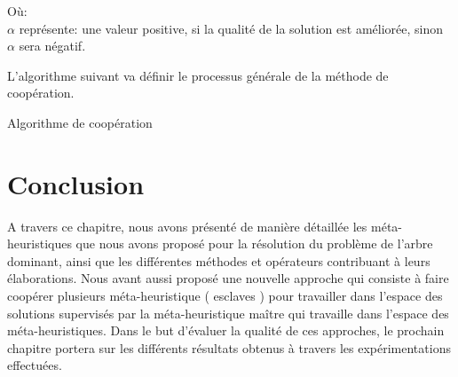Où:\\
$\alpha$ représente: une valeur positive, si la qualité de la solution est améliorée, sinon $\alpha$ sera négatif.

L’algorithme suivant va définir le processus générale de la méthode de coopération.\\

\begin{algorithm}[H]
\label{alg:CA}
\caption{Algorithme de coopération}
\SetAlgoLined
\DontPrintSemicolon
\large

\end{algorithm}


\section{Conclusion}
A travers ce chapitre, nous avons présenté de manière détaillée les méta-heuristiques que nous avons proposé pour la résolution du problème de l’arbre dominant, ainsi que les différentes méthodes et opérateurs contribuant à leurs élaborations. Nous avant aussi proposé une nouvelle approche qui consiste à faire coopérer plusieurs méta-heuristique ( esclaves ) pour travailler dans l’espace des solutions supervisés par la méta-heuristique maître qui travaille dans l’espace des méta-heuristiques. Dans le but d’évaluer la qualité de ces approches, le prochain chapitre portera sur les différents résultats obtenus à travers les expérimentations effectuées.
